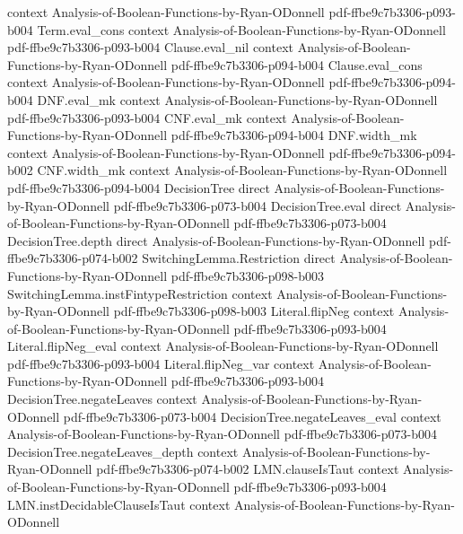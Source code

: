 \begin{theorem}
  {context}
  {Analysis-of-Boolean-Functions-by-Ryan-ODonnell}
  {pdf-ffbe9c7b3306-p093-b004}
\proofstep
  {Term.eval_cons}
  {context}
  {Analysis-of-Boolean-Functions-by-Ryan-ODonnell}
  {pdf-ffbe9c7b3306-p093-b004}
\proofstep
  {Clause.eval_nil}
  {context}
  {Analysis-of-Boolean-Functions-by-Ryan-ODonnell}
  {pdf-ffbe9c7b3306-p094-b004}
\proofstep
  {Clause.eval_cons}
  {context}
  {Analysis-of-Boolean-Functions-by-Ryan-ODonnell}
  {pdf-ffbe9c7b3306-p094-b004}
\proofstep
  {DNF.eval_mk}
  {context}
  {Analysis-of-Boolean-Functions-by-Ryan-ODonnell}
  {pdf-ffbe9c7b3306-p093-b004}
\proofstep
  {CNF.eval_mk}
  {context}
  {Analysis-of-Boolean-Functions-by-Ryan-ODonnell}
  {pdf-ffbe9c7b3306-p094-b004}
\proofstep
  {DNF.width_mk}
  {context}
  {Analysis-of-Boolean-Functions-by-Ryan-ODonnell}
  {pdf-ffbe9c7b3306-p094-b002}
\proofstep
  {CNF.width_mk}
  {context}
  {Analysis-of-Boolean-Functions-by-Ryan-ODonnell}
  {pdf-ffbe9c7b3306-p094-b004}
\proofstep
  {DecisionTree}
  {direct}
  {Analysis-of-Boolean-Functions-by-Ryan-ODonnell}
  {pdf-ffbe9c7b3306-p073-b004}
\proofstep
  {DecisionTree.eval}
  {direct}
  {Analysis-of-Boolean-Functions-by-Ryan-ODonnell}
  {pdf-ffbe9c7b3306-p073-b004}
\proofstep
  {DecisionTree.depth}
  {direct}
  {Analysis-of-Boolean-Functions-by-Ryan-ODonnell}
  {pdf-ffbe9c7b3306-p074-b002}
\proofstep
  {SwitchingLemma.Restriction}
  {direct}
  {Analysis-of-Boolean-Functions-by-Ryan-ODonnell}
  {pdf-ffbe9c7b3306-p098-b003}
\proofstep
  {SwitchingLemma.instFintypeRestriction}
  {context}
  {Analysis-of-Boolean-Functions-by-Ryan-ODonnell}
  {pdf-ffbe9c7b3306-p098-b003}
\proofstep
  {Literal.flipNeg}
  {context}
  {Analysis-of-Boolean-Functions-by-Ryan-ODonnell}
  {pdf-ffbe9c7b3306-p093-b004}
\proofstep
  {Literal.flipNeg_eval}
  {context}
  {Analysis-of-Boolean-Functions-by-Ryan-ODonnell}
  {pdf-ffbe9c7b3306-p093-b004}
\proofstep
  {Literal.flipNeg_var}
  {context}
  {Analysis-of-Boolean-Functions-by-Ryan-ODonnell}
  {pdf-ffbe9c7b3306-p093-b004}
\proofstep
  {DecisionTree.negateLeaves}
  {context}
  {Analysis-of-Boolean-Functions-by-Ryan-ODonnell}
  {pdf-ffbe9c7b3306-p073-b004}
\proofstep
  {DecisionTree.negateLeaves_eval}
  {context}
  {Analysis-of-Boolean-Functions-by-Ryan-ODonnell}
  {pdf-ffbe9c7b3306-p073-b004}
\proofstep
  {DecisionTree.negateLeaves_depth}
  {context}
  {Analysis-of-Boolean-Functions-by-Ryan-ODonnell}
  {pdf-ffbe9c7b3306-p074-b002}
\proofstep
  {LMN.clauseIsTaut}
  {context}
  {Analysis-of-Boolean-Functions-by-Ryan-ODonnell}
  {pdf-ffbe9c7b3306-p093-b004}
\proofstep
  {LMN.instDecidableClauseIsTaut}
  {context}
  {Analysis-of-Boolean-Functions-by-Ryan-ODonnell}

\end{theorem}

